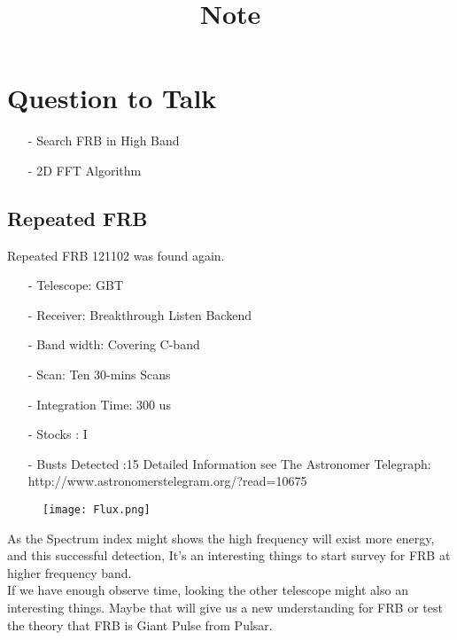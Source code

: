 \documentclass{article}
\begin{document}
\title{Note}
\maketitle
\section{Question to Talk}
\begin{itemize}
\item[-] Search FRB in High Band
\item[-] 2D FFT Algorithm
\end{itemize}
\subsection{Repeated FRB}
Repeated FRB 121102 was found again.
\begin{itemize}
\item[-] Telescope: GBT
\item[-] Receiver: Breakthrough Listen Backend
\item[-] Band width: Covering C-band
\item[-] Scan:	Ten 30-mins Scans
\item[-] Integration Time: 300 us 
\item[-] Stocks : I
\item[-] Busts Detected :15
Detailed Information see The Astronomer Telegraph:\\
http://www.astronomerstelegram.org/?read=10675

\end{itemize}
\begin{figure}
\center
\texttt{[image: Flux.png]} 
\end{figure}
As the Spectrum index might shows the high frequency will exist more energy, and this successful detection, It's an interesting things to start survey for FRB at higher frequency band.\\



If we have enough observe time, looking the other telescope might also an interesting things. Maybe that will give us a new understanding for FRB or test the theory that FRB is Giant Pulse from Pulsar. 
\end{document}
